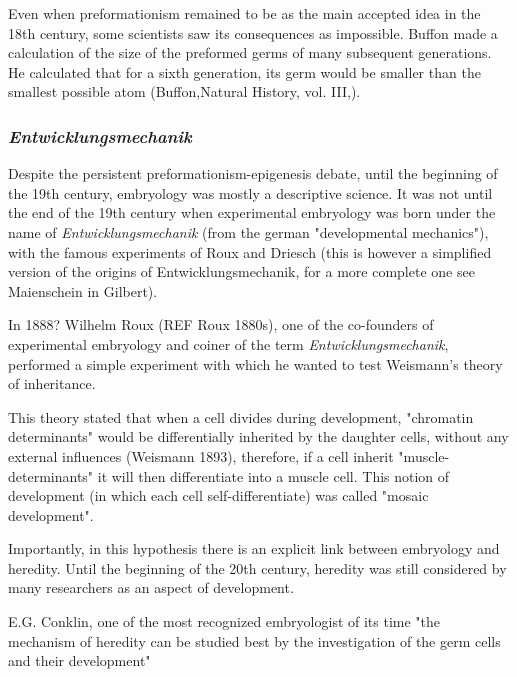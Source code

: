 Even when preformationism remained to be as the main accepted idea in the 18th century, some scientists saw its consequences as impossible. Buffon made a calculation of the size of the preformed germs of many subsequent generations. He calculated that for a sixth generation, its germ would be smaller than the smallest possible atom (Buffon,Natural History, vol. III,).


\subsubsection{\textit{Entwicklungsmechanik}}

Despite the persistent preformationism-epigenesis debate, until the beginning of the 19th century, embryology was mostly a descriptive science. It was not until the end of the 19th century when experimental embryology was born under the name of \textit{Entwicklungsmechanik} (from the german "developmental mechanics"), with the famous experiments of Roux and Driesch (this is however a simplified version of the origins of Entwicklungsmechanik, for a more complete one see Maienschein in Gilbert).

In 1888? Wilhelm Roux (REF Roux 1880s), one of the co-founders of experimental embryology and coiner of the term \textit{Entwicklungsmechanik}, performed a simple experiment with which he wanted to test Weismann's theory of inheritance.

This theory stated that when a cell divides during development, "chromatin determinants" would be differentially inherited by the daughter cells, without any external influences (Weismann 1893), therefore, if a cell inherit "muscle-determinants" it will then differentiate into a muscle cell. 
This notion of development (in which each cell self-differentiate) was called "mosaic development".

Importantly, in this hypothesis there is an explicit link between embryology and heredity. 
Until the beginning of the 20th century, heredity was still considered by many researchers as an aspect of development.

E.G. Conklin, one of the most recognized embryologist of its time 
"the mechanism of heredity
can be studied best by the investigation of
the germ cells and their development"

